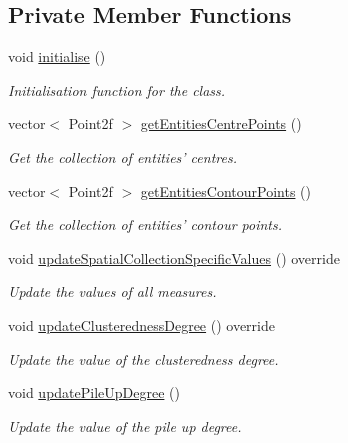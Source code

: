 \subsection*{Private Member Functions}
\begin{DoxyCompactItemize}
\item 
void \hyperlink{classmultiscale_1_1analysis_1_1Cluster_a3af6980def4fbfea38ccd86620f127f8}{initialise} ()
\begin{DoxyCompactList}\small\item\em Initialisation function for the class. \end{DoxyCompactList}\item 
vector$<$ Point2f $>$ \hyperlink{classmultiscale_1_1analysis_1_1Cluster_af24261b08126bc2d2f51144056c6d353}{get\-Entities\-Centre\-Points} ()
\begin{DoxyCompactList}\small\item\em Get the collection of entities' centres. \end{DoxyCompactList}\item 
vector$<$ Point2f $>$ \hyperlink{classmultiscale_1_1analysis_1_1Cluster_adbb1a108b2ae638fbba0450c7f7fee20}{get\-Entities\-Contour\-Points} ()
\begin{DoxyCompactList}\small\item\em Get the collection of entities' contour points. \end{DoxyCompactList}\item 
void \hyperlink{classmultiscale_1_1analysis_1_1Cluster_aee8272e740fe640a6bf5260746d34080}{update\-Spatial\-Collection\-Specific\-Values} () override
\begin{DoxyCompactList}\small\item\em Update the values of all measures. \end{DoxyCompactList}\item 
void \hyperlink{classmultiscale_1_1analysis_1_1Cluster_a2279d1567eec7c0b1e29cae26cfb4d73}{update\-Clusteredness\-Degree} () override
\begin{DoxyCompactList}\small\item\em Update the value of the clusteredness degree. \end{DoxyCompactList}\item 
void \hyperlink{classmultiscale_1_1analysis_1_1Cluster_a66d6f21c8de45bb5080264a4f87e34de}{update\-Pile\-Up\-Degree} ()
\begin{DoxyCompactList}\small\item\em Update the value of the pile up degree. \end{DoxyCompactList}\item 

\end{DoxyCompactItemize}
